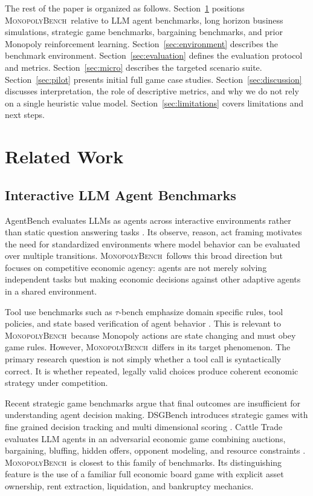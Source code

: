 \documentclass[conference]{IEEEtran}
\newcommand{\Bench}{\textsc{MonopolyBench}}
\begin{document}
The rest of the paper is organized as follows. Section~\ref{sec:related} positions \Bench\ relative to LLM agent benchmarks, long horizon business simulations, strategic game benchmarks, bargaining benchmarks, and prior Monopoly reinforcement learning. Section~\ref{sec:environment} describes the benchmark environment. Section~\ref{sec:evaluation} defines the evaluation protocol and metrics. Section~\ref{sec:micro} describes the targeted scenario suite. Section~\ref{sec:pilot} presents initial full game case studies. Section~\ref{sec:discussion} discusses interpretation, the role of descriptive metrics, and why we do not rely on a single heuristic value model. Section~\ref{sec:limitations} covers limitations and next steps.

\section{Related Work}
\label{sec:related}

\subsection{Interactive LLM Agent Benchmarks}

AgentBench evaluates LLMs as agents across interactive environments rather than static question answering tasks \cite{agentbench}. Its observe, reason, act framing motivates the need for standardized environments where model behavior can be evaluated over multiple transitions. \Bench\ follows this broad direction but focuses on competitive economic agency: agents are not merely solving independent tasks but making economic decisions against other adaptive agents in a shared environment.

Tool use benchmarks such as \(\tau\)-bench emphasize domain specific rules, tool policies, and state based verification of agent behavior \cite{taubench}. This is relevant to \Bench\ because Monopoly actions are state changing and must obey game rules. However, \Bench\ differs in its target phenomenon. The primary research question is not simply whether a tool call is syntactically correct. It is whether repeated, legally valid choices produce coherent economic strategy under competition.

Recent strategic game benchmarks argue that final outcomes are insufficient for understanding agent decision making. DSGBench introduces strategic games with fine grained decision tracking and multi dimensional scoring \cite{dsgbench}. Cattle Trade evaluates LLM agents in an adversarial economic game combining auctions, bargaining, bluffing, hidden offers, opponent modeling, and resource constraints \cite{cattletrade}. \Bench\ is closest to this family of benchmarks. Its distinguishing feature is the use of a familiar full economic board game with explicit asset ownership, rent extraction, liquidation, and bankruptcy mechanics.
\end{document}
